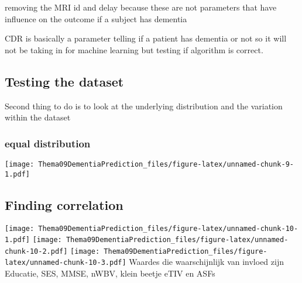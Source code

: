 \documentclass[
]{article}
\begin{document}
removing the MRI id and delay because these are not parameters that have
influence on the outcome if a subject has dementia

CDR is basically a parameter telling if a patient has dementia or not so
it will not be taking in for machine learning but testing if algorithm
is correct.

\hypertarget{testing-the-dataset}{%
\subsection{Testing the dataset}\label{testing-the-dataset}}

Second thing to do is to look at the underlying distribution and the
variation within the dataset

\hypertarget{equal-distribution}{%
\subsubsection{equal distribution}\label{equal-distribution}}

\texttt{[image: Thema09DementiaPrediction\_files/figure-latex/unnamed-chunk-9-1.pdf]}

\hypertarget{finding-correlation}{%
\subsection{Finding correlation}\label{finding-correlation}}

\texttt{[image: Thema09DementiaPrediction\_files/figure-latex/unnamed-chunk-10-1.pdf]}
\texttt{[image: Thema09DementiaPrediction\_files/figure-latex/unnamed-chunk-10-2.pdf]}
\texttt{[image: Thema09DementiaPrediction\_files/figure-latex/unnamed-chunk-10-3.pdf]}
Waardes die waarschijnlijk van invloed zijn Educatie, SES, MMSE, nWBV,
klein beetje eTIV en ASFs
\end{document}
